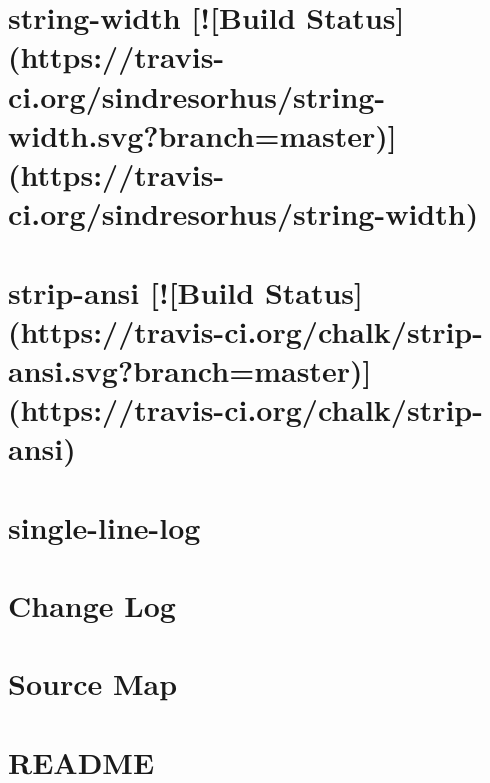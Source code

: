 \documentclass[twoside]{book}
\newcommand{\+}{\discretionary{\mbox{\scriptsize$\hookleftarrow$}}{}{}}
\begin{document}
\chapter{string-\/width \mbox{[}!\mbox{[}Build Status\mbox{]}(https\+://travis-\/ci.org/sindresorhus/string-\/width.svg?branch=master)\mbox{]}(https\+://travis-\/ci.org/sindresorhus/string-\/width)}
\label{md_dsmacc_examples_DRmerge_node_modules_single-line-log_node_modules_string-width_readme}

\chapter{strip-\/ansi \mbox{[}!\mbox{[}Build Status\mbox{]}(https\+://travis-\/ci.org/chalk/strip-\/ansi.svg?branch=master)\mbox{]}(https\+://travis-\/ci.org/chalk/strip-\/ansi)}
\label{md_dsmacc_examples_DRmerge_node_modules_single-line-log_node_modules_strip-ansi_readme}

\chapter{single-\/line-\/log}
\label{md_dsmacc_examples_DRmerge_node_modules_single-line-log_README}

\chapter{Change Log}
\label{md_dsmacc_examples_DRmerge_node_modules_source-map_CHANGELOG}

\chapter{Source Map}
\label{md_dsmacc_examples_DRmerge_node_modules_source-map_README}

\chapter{R\+E\+A\+D\+ME}
\label{md_dsmacc_examples_DRmerge_node_modules_spdx-correct_README}

\end{document}
